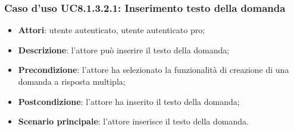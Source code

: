 \newpage
\subsubsection{Caso d'uso UC8.1.3.2.1: Inserimento testo della domanda}
	\begin{itemize}
		\item
			\textbf{Attori}: utente autenticato, utente autenticato pro;
		\item		
			\textbf{Descrizione}: l'attore può inserire il testo della domanda;
		\item
			\textbf{Precondizione}: l'attore ha selezionato la funzionalità di creazione di una domanda a risposta multipla; 
		\item
			\textbf{Postcondizione}: l'attore ha inserito il testo della domanda;
		\item
			\textbf{Scenario principale}: l'attore inserisce il testo della domanda. 
	 			
	\end{itemize}
	
